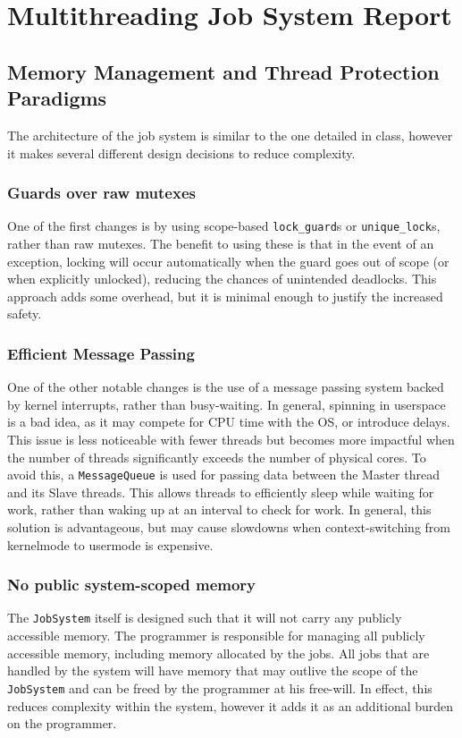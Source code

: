 \documentclass{article}
\begin{document}
\section*{Multithreading Job System Report}
	\subsection{Memory Management and Thread Protection Paradigms}
	The architecture of the job system is similar to the one detailed in class, however it makes several different design decisions to reduce complexity.
		\subsubsection{Guards over raw mutexes}
		One of the first changes is by using scope-based \texttt{lock\_guard}s or \texttt{unique\_lock}s, rather than raw mutexes. The benefit to using these is that in the event of an exception, locking will occur automatically when the guard goes out of scope (or when explicitly unlocked), reducing the chances of unintended deadlocks. This approach adds some overhead, but it is minimal enough to justify the increased safety.
		\subsubsection{Efficient Message Passing}
			One of the other notable changes is the use of a message passing system backed by kernel interrupts, rather than busy-waiting. In general, spinning in userspace is a bad idea, as it may compete for CPU time with the OS, or introduce delays. This issue is less noticeable with fewer threads but becomes more impactful when the number of threads significantly exceeds the number of physical cores. To avoid this, a \texttt{MessageQueue} is used for passing data between the Master thread and its Slave threads. This allows threads to efficiently sleep while waiting for work, rather than waking up at an interval to check for work. In general, this solution is advantageous, but may cause slowdowns when context-switching from kernelmode to usermode is expensive.
		\subsubsection{No public system-scoped memory}
			The \texttt{JobSystem} itself is designed such that it will not carry any publicly accessible memory. The programmer is responsible for managing all publicly accessible memory, including memory allocated by the jobs. All jobs that are handled by the system will have memory that may outlive the scope of the \texttt{JobSystem} and can be freed by the programmer at his free-will. In effect, this reduces complexity within the system, however it adds it as an additional burden on the programmer.
\end{document}
